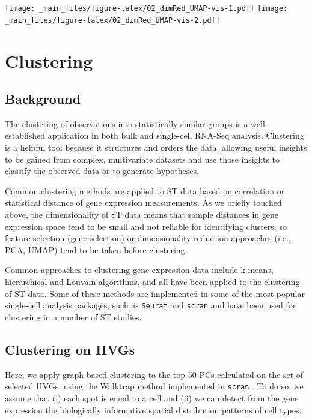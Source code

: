 \documentclass[
]{book}
\begin{document}
\texttt{[image: \_main\_files/figure-latex/02\_dimRed\_UMAP-vis-1.pdf]} \texttt{[image: \_main\_files/figure-latex/02\_dimRed\_UMAP-vis-2.pdf]}

\hypertarget{clustering}{%
\section{Clustering}\label{clustering}}

\hypertarget{background-3}{%
\subsection{Background}\label{background-3}}

The clustering of observations into statistically similar groups is a well-established application in both bulk and single-cell RNA-Seq analysis. Clustering is a helpful tool because it structures and orders the data, allowing useful insights to be gained from complex, multivariate datasets and use those insights to classify the observed data or to generate hypotheses.

Common clustering methods are applied to ST data based on correlation or statistical distance of gene expression measurements. As we briefly touched above, the dimensionality of ST data means that sample distances in gene expression space tend to be small and not reliable for identifying clusters, so feature selection (gene selection) or dimensionality reduction approaches (i.e., PCA, UMAP) tend to be taken before clustering.

Common approaches to clustering gene expression data include k-means, hierarchical and Louvain algorithms, and all have been applied to the clustering of ST data. Some of these methods are implemented in some of the most popular single-cell analysis packages, such as \texttt{Seurat} \citep{Hao2021Jun} and \texttt{scran} \citep{Lun2016Oct} and have been used for clustering in a number of ST studies.

\hypertarget{clustering-on-hvgs}{%
\subsection{Clustering on HVGs}\label{clustering-on-hvgs}}

Here, we apply graph-based clustering to the top 50 PCs calculated on the set of selected HVGs, using the Walktrap method implemented in \texttt{scran} \citep{Lun2016Oct}. To do so, we assume that (i) each spot is equal to a cell and (ii) we can detect from the gene expression the biologically informative spatial distribution patterns of cell types.
\end{document}
